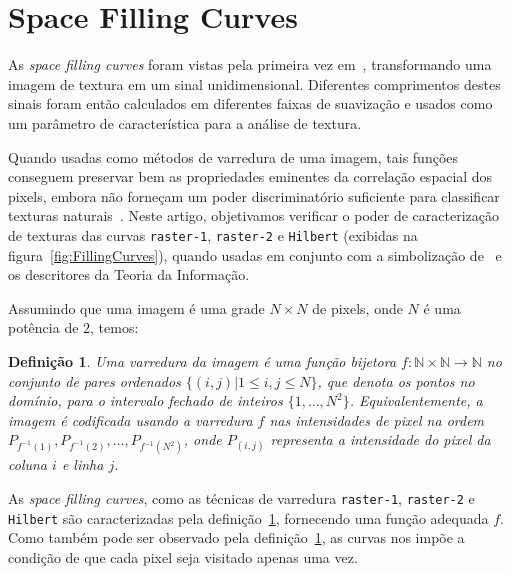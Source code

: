 \documentclass[remotesensing,article,submit,moreauthors,pdftex,10pt,a4paper]{Definitions/mdpi}
\begin{document}
	\section{Space Filling Curves}\label{Curves}
	
	As \textit{space filling curves} foram vistas pela primeira vez em~\cite{Nguyen1982SpaceFC}, transformando uma imagem de textura em um sinal unidimensional. Diferentes comprimentos destes sinais foram então calculados em diferentes faixas de suavização e usados como um parâmetro de característica para a análise de textura.
	
	Quando usadas como métodos de varredura de uma imagem, tais funções conseguem preservar bem as propriedades eminentes da correlação espacial dos pixels, embora não forneçam um poder discriminatório suficiente para classificar texturas naturais~\cite{Lee1994Texture}. Neste artigo, objetivamos verificar o poder de caracterização de texturas das curvas \texttt{raster-1}, \texttt{raster-2} e \texttt{Hilbert} (exibidas na figura~\ref{fig:FillingCurves}), quando usadas em conjunto com a simbolização de~\cite{Bandt2002Permutation} e os descritores da Teoria da Informação. 
	
	Assumindo que uma imagem é uma grade $N \times N$ de pixels, onde $N$ é uma potência de $2$, temos: 
	
	\newtheorem{mydef}{Definição}
	\begin{mydef}
		Uma varredura da imagem é uma função bijetora $f: \mathbb{N} \times \mathbb{N} \to \mathbb{N}$ no conjunto de pares ordenados $\{(i,j) | 1\leq i,j \leq N\}$, que denota os pontos no domínio, para o intervalo fechado de inteiros $\{1, \dots, N^2\}$. Equivalentemente, a imagem é codificada usando a varredura $f$ nas intensidades de pixel na ordem $P_{f^{-1}(1)}, P_{f^{-1}(2)}, \dots, P_{f^{-1}(N^2)}$, onde $P_{(i,j)}$ representa a intensidade do pixel da coluna $i$ e linha $j$.
		\label{def:CurveFilling}
	\end{mydef}
	
	As \textit{space filling curves}, como as técnicas de varredura \texttt{raster-1}, \texttt{raster-2} e \texttt{Hilbert} são caracterizadas pela definição~\ref{def:CurveFilling}, fornecendo uma função adequada $f$. Como também pode ser observado pela definição~\ref{def:CurveFilling}, as curvas nos impõe a condição de que cada pixel seja visitado apenas uma vez.
	
\end{document}
